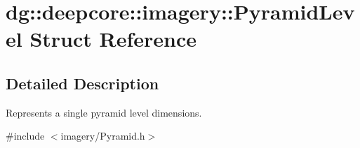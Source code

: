 \hypertarget{structdg_1_1deepcore_1_1imagery_1_1_pyramid_level}{}\section{dg\+:\+:deepcore\+:\+:imagery\+:\+:Pyramid\+Level Struct Reference}
\label{structdg_1_1deepcore_1_1imagery_1_1_pyramid_level}


\subsection{Detailed Description}
Represents a single pyramid level dimensions. 

{\ttfamily \#include $<$imagery/\+Pyramid.\+h$>$}

